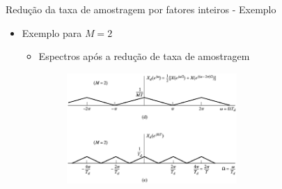 \begin{slide}{Redução da taxa de amostragem por fatores inteiros - Exemplo}
	\begin{itemize}
		\item Exemplo para $M=2$
			\begin{itemize}
		\item Espectros após a redução de taxa de amostragem 
			\begin{figure}
				\centering
				\includegraphics[width=0.65\textwidth]{figs/4-20de.eps}
		        \end{figure}
			\end{itemize}
	\end{itemize}
\end{slide} 

